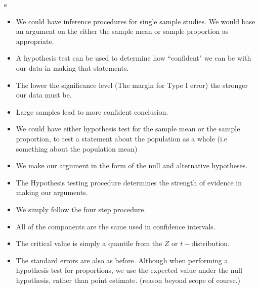s\documentclass[]{report}
\begin{document}
\begin{itemize}
\item We could have inference procedures for single sample studies. We would base an argument on the either the sample mean or sample proportion as appropriate.
\item A hypothesis test can be used to determine how ``confident" we can be with our data in making that statements.
\item The lower the significance level (The margin for Type I error) the stronger our data must be.
\item Large samples lead to more confident conclusion.

\medskip

\item We could have either hypothesis test for the sample mean or the sample proportion, to test a statement about the population as a whole (i.e something about the population mean)
\item We make our argument in the form of the null and alternative hypotheses. 
\item The Hypothesis testing procedure determines the strength of evidence in making our arguments. 

\medskip

\item We simply follow the four step procedure. 
\item All of the components are the same used in confidence intervals.
\item The critical value is simply a quantile from the $Z$ or $t-$distribution.
\item The standard errors are also as before. Although when performing a hypothesis test for proportions, we use the expected value under the null hypothesis, rather than point estimate. (reason beyond scope of course.)
\end{itemize}


\end{document}
